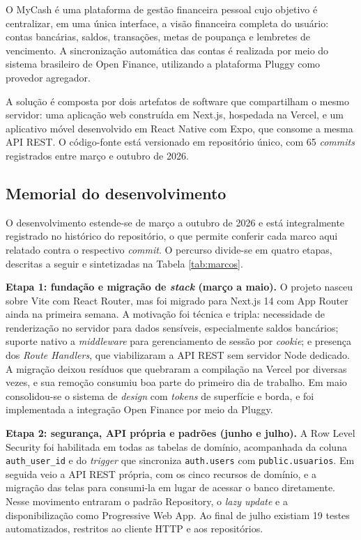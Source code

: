 \documentclass[12pt,a4paper]{article}
\begin{document}
O MyCash é uma plataforma de gestão financeira pessoal cujo objetivo é centralizar, em uma única interface, a visão financeira completa do usuário: contas bancárias, saldos, transações, metas de poupança e lembretes de vencimento. A sincronização automática das contas é realizada por meio do sistema brasileiro de Open Finance, utilizando a plataforma Pluggy como provedor agregador.

A solução é composta por dois artefatos de software que compartilham o mesmo servidor: uma aplicação web construída em Next.js, hospedada na Vercel, e um aplicativo móvel desenvolvido em React Native com Expo, que consome a mesma API REST. O código-fonte está versionado em repositório único, com 65 \textit{commits} registrados entre março e outubro de 2026.

\subsection{Memorial do desenvolvimento}

O desenvolvimento estende-se de março a outubro de 2026 e está integralmente
registrado no histórico do repositório, o que permite conferir cada marco aqui
relatado contra o respectivo \textit{commit}. O percurso divide-se em quatro
etapas, descritas a seguir e sintetizadas na Tabela \ref{tab:marcos}.

\textbf{Etapa 1: fundação e migração de \textit{stack} (março a maio).} O
projeto nasceu sobre Vite com React Router, mas foi migrado para Next.js 14
com App Router ainda na primeira semana. A motivação foi técnica e tripla:
necessidade de renderização no servidor para dados sensíveis, especialmente
saldos bancários; suporte nativo a \textit{middleware} para gerenciamento de
sessão por \textit{cookie}; e presença dos \textit{Route Handlers}, que
viabilizaram a API REST sem servidor Node dedicado. A migração deixou resíduos
que quebraram a compilação na Vercel por diversas vezes, e sua remoção consumiu
boa parte do primeiro dia de trabalho. Em maio consolidou-se o sistema de
\textit{design} com \textit{tokens} de superfície e borda, e foi implementada a
integração Open Finance por meio da Pluggy.

\textbf{Etapa 2: segurança, API própria e padrões (junho e julho).} A Row Level
Security foi habilitada em todas as tabelas de domínio, acompanhada da coluna
\texttt{auth\_user\_id} e do \textit{trigger} que sincroniza
\texttt{auth.users} com \texttt{public.usuarios}. Em seguida veio a API REST
própria, com os cinco recursos de domínio, e a migração das telas para
consumi-la em lugar de acessar o banco diretamente. Nesse movimento entraram o
padrão Repository, o \textit{lazy update} e a disponibilização como Progressive
Web App. Ao final de julho existiam 19 testes automatizados, restritos ao
cliente HTTP e aos repositórios.
\end{document}
